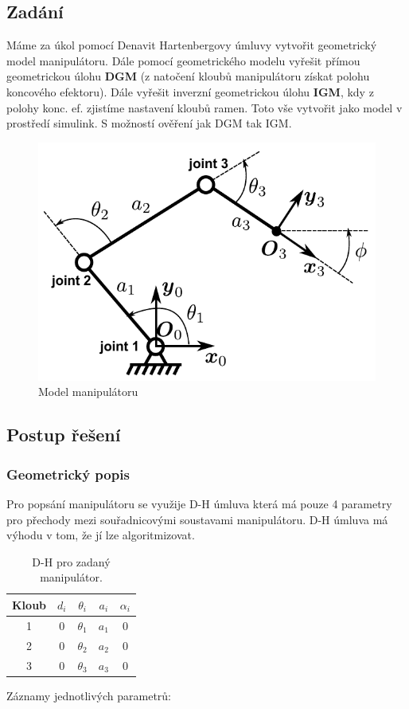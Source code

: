 \documentclass{article}
\begin{document}
		\subsection{Zadání}
			Máme za úkol pomocí Denavit Hartenbergovy úmluvy vytvořit geometrický model manipulátoru. Dále pomocí geometrického modelu vyřešit přímou geometrickou úlohu \textbf{DGM} (z natočení kloubů manipulátoru získat polohu koncového efektoru). Dále vyřešit inverzní geometrickou úlohu \textbf{IGM}, kdy z polohy konc. ef. zjistíme nastavení kloubů ramen. Toto vše vytvořit jako model v prostředí simulink. S možností ověření jak DGM tak IGM.  
				\begin{figure}[H]
					\centering
					\includegraphics[width=\textwidth]{./Graphics/2_Graphics/manipulator_kresba.pdf}
					\caption{Model manipulátoru}
					\label{pic:2_manipulator_kresba}
				\end{figure}
		\subsection{Postup řešení}
			\subsubsection{Geometrický popis}
				Pro popsání manipulátoru se využije D-H úmluva která má pouze 4 parametry pro přechody mezi souřadnicovými soustavami manipulátoru. D-H úmluva má výhodu v tom, že jí lze algoritmizovat. 
					\begin{table}[H]
						\begin{tabular}{|c|c|c|c|c|}
							\hline
							Kloub & \(d_i\) & \(\theta_i\) & \(a_i\) & \(\alpha_i\) \\
							\hline
							1 & \(0\) & \(\theta_1\) & \(a_1\) & \(0\) \\
							\hline
							2 & \(0\) & \(\theta_2\) & \(a_2\) & \(0\) \\
							\hline
							3 & \(0\) & \(\theta_3\) & \(a_3\) & \(0\) \\
							\hline
						\end{tabular}
						\centering
						\caption{D-H pro zadaný manipulátor.}
						\label{tab:dh_params}
					\end{table}
				\newpage
				Záznamy jednotlivých parametrů:
				
\end{document}
